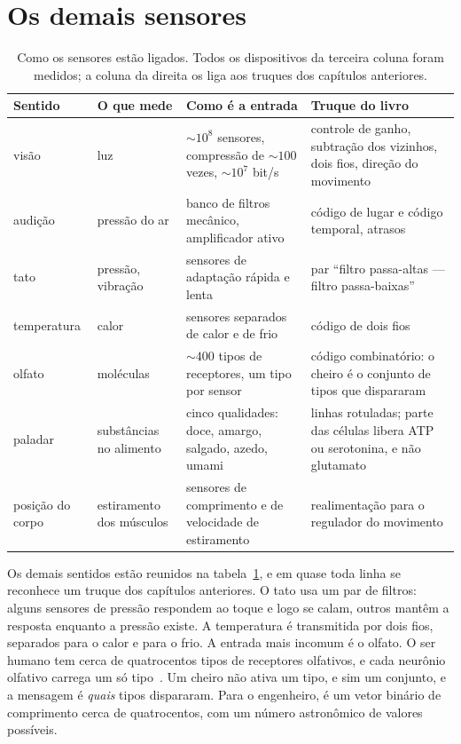 \section{Os demais sensores}

\begin{table}[t]
\centering
\footnotesize
\setlength{\tabcolsep}{3pt}
\renewcommand{\arraystretch}{1.15}
\begin{tabular}{>{\raggedright}p{1.9cm}>{\raggedright}p{2.6cm}>{\raggedright}p{4.0cm}>{\raggedright\arraybackslash}p{4.6cm}}
\toprule
Sentido & O que mede & Como é a entrada & Truque do livro \\
\midrule
visão & luz & $\sim10^8$ sensores, compressão de $\sim100$ vezes, $\sim10^7$ bit/s & controle de ganho, subtração dos vizinhos, dois fios, direção do movimento \\
audição & pressão do ar & banco de filtros mecânico, amplificador ativo & código de lugar e código temporal, atrasos \\
tato & pressão, vibração & sensores de adaptação rápida e lenta & par ``filtro passa-altas --- filtro passa-baixas'' \\
temperatura & calor & sensores separados de calor e de frio & código de dois fios \\
olfato & moléculas & $\sim400$ tipos de receptores, um tipo por sensor & código combinatório: o cheiro é o conjunto de tipos que dispararam \\
paladar & substâncias no alimento & cinco qualidades: doce, amargo, salgado, azedo, umami & linhas rotuladas; parte das células libera ATP ou serotonina, e não glutamato \\
posição do corpo & estiramento dos músculos & sensores de comprimento e de velocidade de estiramento & realimentação para o regulador do movimento \\
\bottomrule
\end{tabular}
\caption{Como os sensores estão ligados. Todos os dispositivos da terceira coluna foram medidos; a coluna da direita os liga aos truques dos capítulos anteriores.}
\label{tab:sensors}
\end{table}

Os demais sentidos estão reunidos na tabela~\ref{tab:sensors}, e em quase toda linha se reconhece um truque dos capítulos anteriores. O tato usa um par de filtros: alguns sensores de pressão respondem ao toque e logo se calam, outros mantêm a resposta enquanto a pressão existe. A temperatura é transmitida por dois fios, separados para o calor e para o frio. A entrada mais incomum é o olfato. O ser humano tem cerca de quatrocentos tipos de receptores olfativos, e cada neurônio olfativo carrega um só tipo~\cite{Mombaerts2004}. Um cheiro não ativa um tipo, e sim um conjunto, e a mensagem é \emph{quais} tipos dispararam. Para o engenheiro, é um vetor binário de comprimento cerca de quatrocentos, com um número astronômico de valores possíveis.

